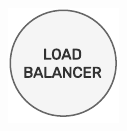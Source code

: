\begin{figure}
  \centering
  \includegraphics[width=\linewidth]{images/architecture/load_balancer.pdf}
\end{figure}

